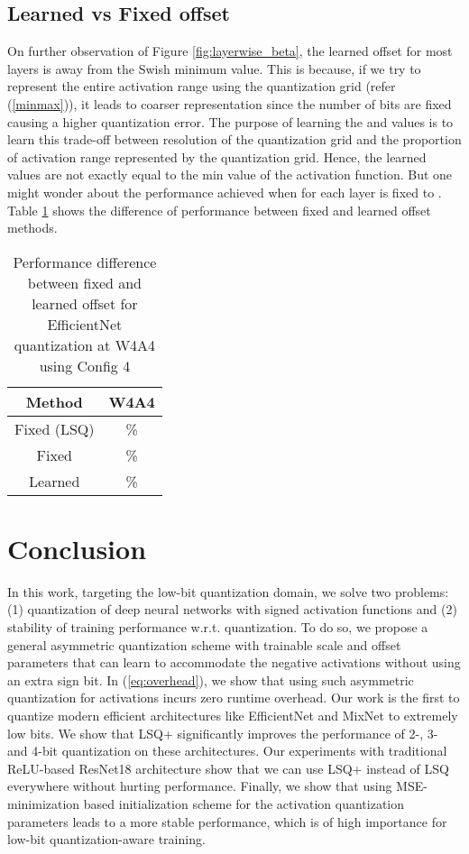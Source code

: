 \documentclass[10pt,twocolumn,letterpaper]{article}
\begin{document}
\subsection{Learned vs Fixed offset}
On further observation of Figure \ref{fig:layerwise_beta}, the learned offset for most layers is away from the Swish minimum value. This is because, if we try to represent the entire activation range using the quantization grid (refer (\ref{minmax})), it leads to coarser representation since the number of bits are fixed causing a higher quantization error. The purpose of learning the  and  values is to learn this trade-off between resolution of the quantization grid and the proportion of activation range represented by the quantization grid. Hence, the learned  values are not exactly equal to the min value of the activation function. But one might wonder about the performance achieved when  for each layer is fixed to . Table \ref{table:fixed_offset} shows the difference of performance between fixed and learned offset methods.
\begin{table}[t]
	\caption{Performance difference between fixed and learned offset for EfficientNet quantization at W4A4 using Config 4}
	\centering
	\begin{tabular}{c| c }
        \toprule
        	Method & {W4A4} \\
			
			\midrule
			Fixed  (LSQ) & \% \\
			Fixed  & \% \\
			Learned  & \% \\
        \bottomrule
	\end{tabular}
	\label{table:fixed_offset}
\end{table}




\section{Conclusion}
In this work, targeting the low-bit quantization domain, we solve two problems: (1) quantization of deep neural networks with signed activation functions and (2) stability of training performance w.r.t. quantization. To do so, we propose a general asymmetric quantization scheme with trainable scale and offset parameters that can learn to accommodate the negative activations without using an extra sign bit. In (\ref{eq:overhead}), we show that using such asymmetric quantization for activations incurs zero runtime overhead. Our work is the first to quantize modern efficient architectures like EfficientNet and MixNet to extremely low bits. We show that LSQ+ significantly improves the performance of 2-, 3- and 4-bit quantization on these architectures. Our experiments with traditional ReLU-based ResNet18 architecture show that we can use LSQ+ instead of LSQ everywhere without hurting performance. Finally, we show that using MSE-minimization based initialization scheme for the activation quantization parameters leads to a more stable performance, which is of high importance for low-bit quantization-aware training.


{\small


}
\end{document}
